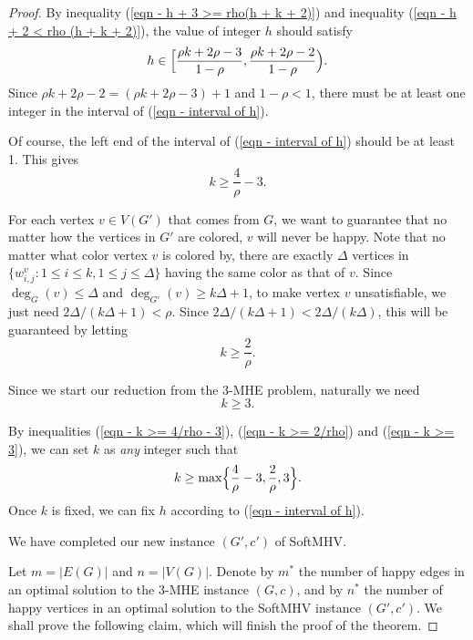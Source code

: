 \documentclass[11pt]{article}
\begin{document}
\begin{proof}
By inequality (\ref{eqn - h + 3 >= rho(h + k + 2)}) and
inequality (\ref{eqn - h + 2 < rho (h + k + 2)}), the value of integer $h$
should satisfy
\begin{equation}
\label{eqn - interval of h}
h \in \Bigl [ \frac{\rho k + 2\rho - 3}{1 - \rho}, \frac{\rho k + 2\rho - 2}{1 - \rho} \Bigr).
\end{equation}
Since $\rho k + 2\rho - 2 = (\rho k + 2\rho - 3) + 1$ and $1 - \rho < 1$,
there must be at least one integer in the interval of
(\ref{eqn - interval of h}).

Of course, the left end of the interval of (\ref{eqn - interval of h})
should be at least 1. This gives
\begin{equation}
\label{eqn - k >= 4/rho - 3}
k \geq \frac4\rho - 3.
\end{equation}

For each vertex $v \in V(G')$ that comes from $G$, we want to guarantee that
no matter how the vertices in $G'$ are colored, $v$ will never be happy.
Note that no matter what color vertex $v$ is colored by,
there are exactly $\Delta$ vertices in
$\{w_{i,j}^v \colon 1 \leq i \leq k, 1 \leq j \leq \Delta \}$ having the
same color as that of $v$.
Since $\deg_G(v) \leq \Delta$ and $\deg_{G'}(v) \geq k\Delta + 1$,
to make vertex $v$ unsatisfiable, we just need $2\Delta / (k \Delta + 1) < \rho$.
Since $2\Delta / (k \Delta + 1) < 2\Delta / (k \Delta)$, this will be
guaranteed by letting
\begin{equation}
\label{eqn - k >= 2/rho}
k \geq \frac2\rho.
\end{equation}

Since we start our reduction from the 3-MHE problem, naturally we need
\begin{equation}
\label{eqn - k >= 3}
k \geq 3.
\end{equation}

By inequalities (\ref{eqn - k >= 4/rho - 3}), (\ref{eqn - k >= 2/rho}) and
(\ref{eqn - k >= 3}), we can set $k$ as {\em any} integer such that
\begin{equation}
k \geq \max \Bigl \{\frac4\rho - 3, \frac2\rho, 3 \Bigr\}. \nonumber
\end{equation}
Once $k$ is fixed, we can fix $h$ according to (\ref{eqn - interval of h}).

We have completed our new instance $(G', c')$ of SoftMHV.

Let $m = |E(G)|$ and $n = |V(G)|$.
Denote by $m^*$ the number of happy edges in an optimal solution to
the 3-MHE instance $(G, c)$, and by $n^*$ the number of happy vertices
in an optimal solution to the SoftMHV instance $(G', c')$.
We shall prove the following claim, which will finish the proof of the
theorem.


\end{proof}
\end{document}
